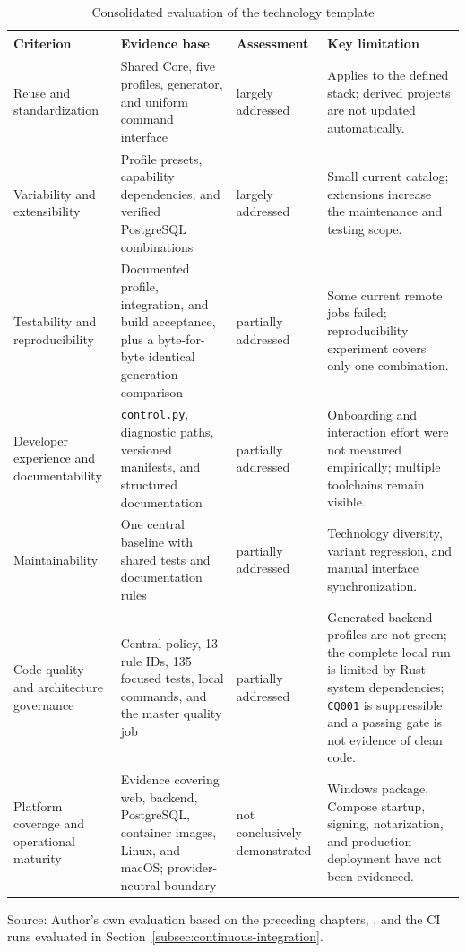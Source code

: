 \begin{table}[htbp]
  \centering
  \scriptsize
  \renewcommand{\arraystretch}{1.08}
  \caption{Consolidated evaluation of the technology template}
  \label{tab:template-evaluation}
  \begin{tabularx}{\textwidth}{@{}>{\raggedright\arraybackslash}p{}>{\raggedright\arraybackslash}p{}>{\raggedright\arraybackslash}p{}>{\raggedright\arraybackslash}X@{}}
    \toprule
    \textbf{Criterion} & \textbf{Evidence base} & \textbf{Assessment} &
      \textbf{Key limitation} \\
    \midrule
    Reuse and standardization & Shared Core, five profiles,
      generator, and uniform command interface & largely addressed &
      Applies to the defined stack; derived projects are not updated automatically. \\
    Variability and extensibility & Profile presets, capability dependencies,
      and verified PostgreSQL combinations & largely addressed & Small
      current catalog; extensions increase the maintenance and testing scope. \\
    Testability and reproducibility & Documented profile, integration,
      and build acceptance, plus a byte-for-byte identical generation comparison &
      partially addressed & Some current remote jobs failed;
      reproducibility experiment covers only one combination. \\
    Developer experience and documentability & \texttt{control.py},
      diagnostic paths, versioned manifests, and structured documentation &
      partially addressed & Onboarding and interaction effort were not measured
      empirically; multiple toolchains remain visible. \\
    Maintainability & One central baseline with shared tests and
      documentation rules & partially addressed & Technology diversity,
      variant regression, and manual interface synchronization. \\
    Code-quality and architecture governance & Central policy, 13 rule IDs,
      135 focused tests, local commands, and the master quality job &
      partially addressed & Generated backend profiles are not green; the
      complete local run is limited by Rust system dependencies;
      \texttt{CQ001} is suppressible and a passing gate is not evidence of clean code. \\
    Platform coverage and operational maturity & Evidence covering web, backend,
      PostgreSQL, container images, Linux, and macOS; provider-neutral boundary &
      not conclusively demonstrated & Windows package, Compose startup, signing,
      notarization, and production deployment have not been evidenced. \\
    \bottomrule
  \end{tabularx}
  \smallskip
  {\footnotesize Source: Author's own evaluation based on the preceding
  chapters, \textcite{kleiveist2026acceptance}, and the CI runs evaluated in
  Section~\ref{subsec:continuous-integration}.\par}
\end{table}
